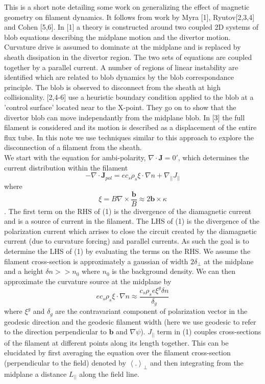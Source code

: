 \documentclass[12pt]{article}
\begin{document}
This is a short note detailing some work on generalizing the effect of magnetic geometry on filament dynamics. It follows from work by Myra [1], Ryutov[2,3,4] and Cohen [5,6]. In [1] a theory is constructed around two coupled 2D systems of blob equations describing the midplane motion and the divertor motion. Curvature drive is assumed to dominate at the midplane and is replaced by sheath dissipation in the divertor region. The two sets of equations are coupled together by a parallel current. A number of regions of linear instability are identified which are related to blob dynamics by the blob correspondance principle. The blob is observed to disconnect from the sheath at high collisionality. [2,4-6] use a heuristic boundary condition applied to the blob at a 'control surface' located near to the X-point. They go on to show that the divertor blob can move independantly from the midplane blob. In [3] the full filament is considered and its motion is described as a displacement of the entire flux tube. In this note we use techniques similar to this approach to explore the disconnection of a filament from the sheath. 
~\\
We start with the equation for ambi-polarity, $\nabla \cdot \textbf{J} = 0'$, which determines the current distribution within the filament 
\begin{equation}  
-\nabla\cdot\textbf{J}_{pol} = ec_{s}\rho_{s}\xi \cdot\nabla n + \nabla_{||}J_{||}
\end{equation}
where 
\[ \xi = B\nabla\times\frac{\textbf{b}}{B} \approx 2\textbf{b}\times\kappa\]. 
The first term on the RHS of (1) is the divergence of the diamagnetic current and is a source of current in the filament. The LHS of (1) is the divergence of the polarization current which arrises to close the circuit created by the diamagnetic current (due to curvature forcing) and parallel currents. As such the goal is to determine the LHS of (1) by evaluating the terms on the RHS. We assume the filament cross-section is approximately a gaussian of width $2\delta_{\perp}$ at the midplane and a height $\delta n >> n_{0}$ where $n_{0}$ is the background density. We can then approximate the curvature source at the midplane by 
\begin{equation}
 ec_{s}\rho_{s}\xi \cdot\nabla n \approx \frac{c_{s}\rho_{s}e\xi^{g} \delta n}{\delta_{g}}
\end{equation}
where $\xi^{g}$ and $\delta_{g}$ are the contravariant component of polarization vector in the geodesic direction and the geodesic filament width (here we use geodesic to refer to the direction perpendicular to $\textbf{b}$ and $\nabla \psi$). $J_{||}$ term in (1) couples cross-sections of the filament at different points along its length together. This can be elucidated by first averaging the equation over the filament cross-section (perpendicular to the field) denoted by $\left<.\right>_{\perp}$ and then integrating from the midplane a distance $L_{||}$ along the field line.
\end{document}
